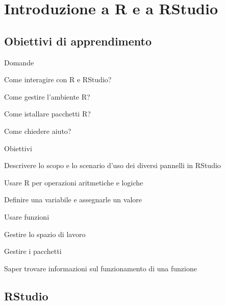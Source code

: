 \chapter{Introduzione a R e a RStudio}
\label{cap:introduzione}


\section*{Obiettivi di apprendimento}


\begin{multicols}{2}
\begin{tcolorbox}[width=1\linewidth, halign=left, colframe=blue!60, colback=white, boxsep=1mm, arc=3mm]

Domande

\begin{myitemize}
	\item Come interagire con R e RStudio?
	\item Come gestire l'ambiente R?
	\item Come istallare pacchetti R?
	\item Come chiedere aiuto?
\end{myitemize}

\end{tcolorbox} 
\columnbreak
\begin{tcolorbox}[width=1\linewidth, halign=left, colframe=blue!60, colback=white, boxsep=1mm, arc=3mm]

Obiettivi

\begin{myitemize}
	\item Descrivere lo scopo e lo scenario d'uso dei diversi pannelli in RStudio
	\item Usare R per operazioni aritmetiche e logiche 
	\item Definire una variabile e assegnarle un valore
	\item Usare funzioni
	\item Gestire lo spazio di lavoro
	\item Gestire i pacchetti
	\item Saper trovare informazioni sul funzionamento di una funzione
\end{myitemize}

\end{tcolorbox} 
\columnbreak
\end{multicols}


\section{RStudio}
\label{sec:RStudio}

